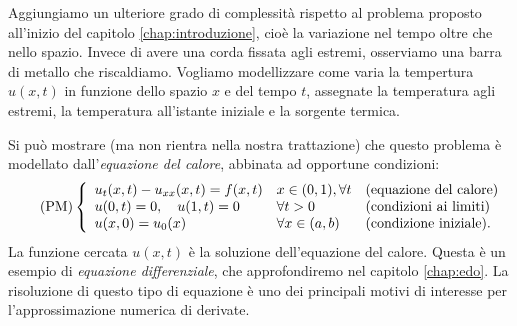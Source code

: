 Aggiungiamo un ulteriore grado di complessità rispetto al problema proposto all'inizio del capitolo \ref{chap:introduzione}, cioè la variazione nel tempo oltre che nello spazio.
Invece di avere una corda fissata agli estremi, osserviamo una barra di metallo che riscaldiamo. Vogliamo modellizzare come varia la tempertura $u( x,t)$ in funzione dello spazio $x$ e del tempo $t$, assegnate la temperatura agli estremi, la temperatura all'istante iniziale e la sorgente termica.

Si può mostrare (ma non rientra nella nostra trattazione) che questo problema è modellato dall'\textit{equazione del calore}, abbinata ad opportune condizioni:
\begin{equation}\tag{PM}\label{eq:pm-calore}
\left\{\begin{array}{ l l l }
u_{t}( x,t) -u_{xx}( x,t) =f( x,t)  & x\in ( 0,1) ,\forall t & \text{(equazione del calore)}\\
u( 0,t) =0,\quad u( 1,t) =0 & \forall t >0 & \text{(condizioni ai limiti)}\\
u( x,0) =u_{0}(x) & \forall x\in ( a,b) & \text{(condizione iniziale).}
\end{array}\right.
\end{equation}
La funzione cercata $u( x,t)$ è la soluzione dell'equazione del calore.
Questa è un esempio di \textit{equazione differenziale}, che approfondiremo nel capitolo \ref{chap:edo}.
La risoluzione di questo tipo di equazione è uno dei principali motivi di interesse per l'approssimazione numerica di derivate.

